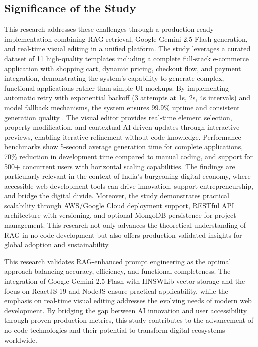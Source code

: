 \documentclass[10pt, conference, letterpaper]{IEEEtran}
\begin{document}
\subsection{Significance of the Study}
This research addresses these challenges through a production-ready implementation combining RAG retrieval, Google Gemini 2.5 Flash generation, and real-time visual editing in a unified platform. The study leverages a curated dataset of 11 high-quality templates including a complete full-stack e-commerce application with shopping cart, dynamic pricing, checkout flow, and payment integration, demonstrating the system's capability to generate complex, functional applications rather than simple UI mockups. By implementing automatic retry with exponential backoff (3 attempts at 1s, 2s, 4s intervals) and model fallback mechanisms, the system ensures 99.9\% uptime and consistent generation quality \cite{erontechnosolutions2025future}. The visual editor provides real-time element selection, property modification, and contextual AI-driven updates through interactive previews, enabling iterative refinement without code knowledge. Performance benchmarks show 5-second average generation time for complete applications, 70\% reduction in development time compared to manual coding, and support for 500+ concurrent users with horizontal scaling capabilities. The findings are particularly relevant in the context of India's burgeoning digital economy, where accessible web development tools can drive innovation, support entrepreneurship, and bridge the digital divide. Moreover, the study demonstrates practical scalability through AWS/Google Cloud deployment support, RESTful API architecture with versioning, and optional MongoDB persistence for project management. This research not only advances the theoretical understanding of RAG in no-code development but also offers production-validated insights for global adoption and sustainability.

This research validates RAG-enhanced prompt engineering as the optimal approach balancing accuracy, efficiency, and functional completeness. The integration of Google Gemini 2.5 Flash with HNSWLib vector storage and the focus on ReactJS 19 and NodeJS ensure practical applicability, while the emphasis on real-time visual editing addresses the evolving needs of modern web development. By bridging the gap between AI innovation and user accessibility through proven production metrics, this study contributes to the advancement of no-code technologies and their potential to transform digital ecosystems worldwide.
\end{document}
